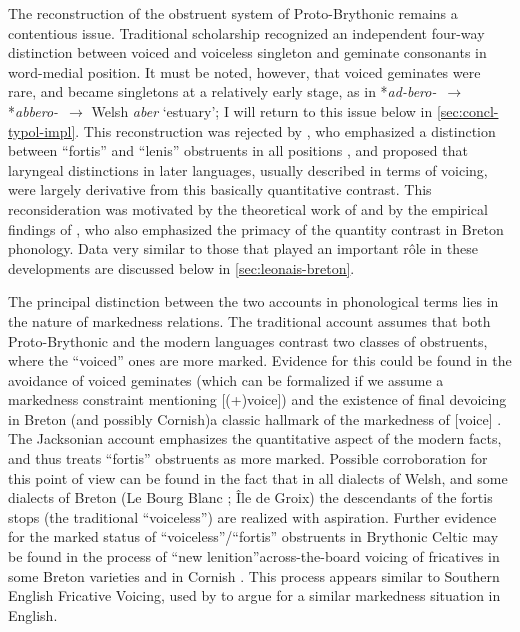 The reconstruction of the obstruent system of Proto\hyp Brythonic remains a contentious issue. Traditional scholarship \citep[\egm][]{wg-mj,lewis37:_celtic} recognized an independent four\hyp way distinction between voiced and voiceless singleton and geminate consonants in word\hyp medial position. It must be noted, however, that voiced geminates were rare, and became singletons at a relatively early stage, as in *\emph{ad-bero-}~$\rightarrow$ *\emph{abbero-}~$\rightarrow$ Welsh \emph{aber} `estuary'; I will return to this issue below in \cref{sec:concl-typol-impl}. This reconstruction was rejected by \citet{lheb,jackson60}, who emphasized a distinction between \enquote{fortis} and \enquote{lenis} obstruents in all positions \citep[\cf also][]{oftedal-lenition}, and proposed that laryngeal distinctions in later languages, usually described in terms of voicing, were largely derivative from this basically quantitative contrast. This reconsideration was motivated by the theoretical work of \citet{mart55} and by the empirical findings of \citet{falchun38:_recher,falchun}, who also emphasized the primacy of the quantity contrast in Breton phonology. Data very similar to those that played an important rôle in these developments are discussed below in \cref{sec:leonais-breton}.

The principal distinction between the two accounts in phonological terms lies in the nature of markedness relations. The traditional account assumes that both Proto\hyp Brythonic and the modern languages contrast two classes of obstruents, where the \enquote{voiced} ones are more marked. Evidence for this could be found in the avoidance of voiced geminates (which can be formalized if we assume a markedness constraint mentioning [(+)voice]) and the existence of final devoicing in Breton (and possibly Cornish)\dash a classic hallmark of the markedness of [voice] \citep[\cfm][]{harris09:_why_final_obstr_devoic_is_weaken}. The Jacksonian account emphasizes the quantitative aspect of the modern facts, and thus treats \enquote{fortis} obstruents as more marked. Possible corroboration for this point of view can be found in the fact that in all dialects of Welsh, and some dialects of Breton (Le Bourg Blanc \dash \citealt{falchun}; Île de Groix\dash \citealt{Ter70}) the descendants of the fortis stops (\ie the traditional \enquote{voiceless}) are realized with aspiration. Further evidence for the marked status of \enquote{voiceless}\fshyp \enquote{fortis} obstruents in Brythonic Celtic may be found in the process of \enquote{new lenition}\dash across\hyp the\hyp board voicing of fricatives in some Breton varieties and in Cornish \citep{histbreton,tristram95:_zaoz_zomer,hewitt99:_remar_breton,chaudhri}. This process appears similar to Southern English Fricative Voicing, used by \citet{honeybone05} to argue for a similar markedness situation in English.

